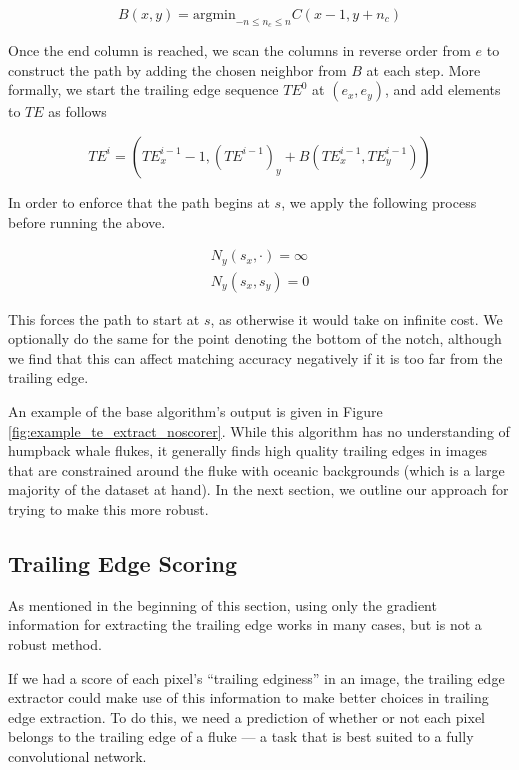 \begin{equation} \label{eqn:backtrace_update}
	B(x,y) = \text{argmin}_{-n \leq n_c \leq n} C(x-1, y+n_c)
\end{equation}

Once the end column is reached, we scan the columns in reverse order from $e$ to construct the path by adding the chosen neighbor from $B$ at each step.
More formally, we start the trailing edge sequence $TE^0$ at $(e_x, e_y)$, and add elements to $TE$ as follows

\begin{equation} \label{eqn:te_build}
	TE^i = (TE^{i-1}_x - 1, (TE^{i-1})_y + B(TE^{i-1}_x,TE^{i-1}_y))
\end{equation}

In order to enforce that the path begins at $s$, we apply the following process before running the above.

\begin{align} \label{eqn:te_setup}
N_y(s_x,\cdot) = \infty \\
N_y(s_x,s_y) = 0
\end{align}

This forces the path to start at $s$, as otherwise it would take on infinite cost.
We optionally do the same for the point denoting the bottom of the notch, although we find that this can affect matching accuracy negatively if it is too far from the trailing edge.

An example of the base algorithm's output is given in Figure \ref{fig:example_te_extract_noscorer}.
While this algorithm has no understanding of humpback whale flukes, it generally finds high quality trailing edges in images that are constrained around the fluke with oceanic backgrounds (which is a large majority of the dataset at hand).
In the next section, we outline our approach for trying to make this more robust.


\subsection{Trailing Edge Scoring}

As mentioned in the beginning of this section, using only the gradient information for extracting the trailing edge works in many cases, but is not a robust method.

If we had a score of each pixel's ``trailing edginess'' in an image, the trailing edge extractor could make use of this information to make better choices in trailing edge extraction.
To do this, we need a prediction of whether or not each pixel belongs to the trailing edge of a fluke --- a task that is best suited to a fully convolutional network.

